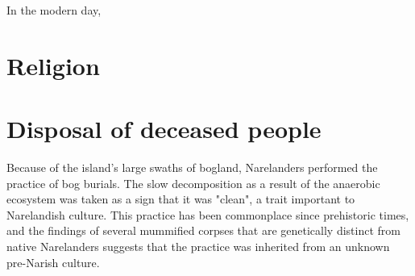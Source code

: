 \documentclass[a4paper,11pt,twoside,openright]{memoir}
\begin{document}
In the modern day, 

\chapter{Religion}

\chapter{Disposal of deceased people}

Because of the island's large swaths of bogland, Narelanders performed the practice of bog burials. The slow decomposition as a result of the anaerobic ecosystem was taken as a sign that it was "clean", a trait important to Narelandish culture. This practice has been commonplace since prehistoric times, and the findings of several mummified corpses that are genetically distinct from native Narelanders suggests that the practice was inherited from an unknown pre-Narish culture.
\end{document}
